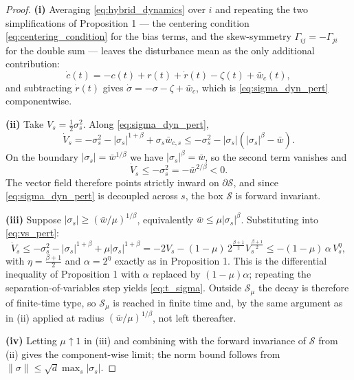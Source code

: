 \documentclass[11pt]{article}
\begin{document}
\begin{proof}
\textbf{(i)} Averaging \eqref{eq:hybrid_dynamics} over $i$ and repeating the two simplifications of Proposition 1 --- the centering condition \eqref{eq:centering_condition} for the bias terms, and the skew-symmetry $\Gamma_{ij} = -\Gamma_{ji}$ for the double sum --- leaves the disturbance mean as the only additional contribution:
\begin{equation}
\dot{c}(t) = -c(t) + r(t) + \dot{r}(t) - \zeta(t) + \bar{w}_c(t),
\end{equation}
and subtracting $\dot{r}(t)$ gives $\dot{\sigma} = -\sigma - \zeta + \bar{w}_c$, which is \eqref{eq:sigma_dyn_pert} componentwise.

\textbf{(ii)} Take $V_s = \frac{1}{2}\sigma_s^2$. Along \eqref{eq:sigma_dyn_pert},
\begin{equation}
\dot{V}_s = -\sigma_s^2 - |\sigma_s|^{1+\beta} + \sigma_s \bar{w}_{c,s} \le -\sigma_s^2 - |\sigma_s|\left(|\sigma_s|^\beta - \bar{w}\right).
\label{eq:vs_pert}
\end{equation}
On the boundary $|\sigma_s| = \bar{w}^{1/\beta}$ we have $|\sigma_s|^\beta = \bar{w}$, so the second term vanishes and
\begin{equation}
\dot{V}_s \le -\sigma_s^2 = -\bar{w}^{2/\beta} < 0 .
\end{equation}
The vector field therefore points strictly inward on $\partial\mathcal{S}$, and since \eqref{eq:sigma_dyn_pert} is decoupled across $s$, the box $\mathcal{S}$ is forward invariant.

\textbf{(iii)} Suppose $|\sigma_s| \ge (\bar{w}/\mu)^{1/\beta}$, equivalently $\bar{w} \le \mu|\sigma_s|^\beta$. Substituting into \eqref{eq:vs_pert}:
\begin{equation}
\dot{V}_s \le -\sigma_s^2 - |\sigma_s|^{1+\beta} + \mu|\sigma_s|^{1+\beta} = -2V_s - (1-\mu)\,2^{\frac{\beta+1}{2}} V_s^{\frac{\beta+1}{2}} \le -(1-\mu)\,\alpha\, V_s^{\eta},
\end{equation}
with $\eta = \frac{\beta+1}{2}$ and $\alpha = 2^\eta$ exactly as in Proposition 1. This is the differential inequality of Proposition 1 with $\alpha$ replaced by $(1-\mu)\alpha$; repeating the separation-of-variables step yields \eqref{eq:t_sigma}. Outside $\mathcal{S}_\mu$ the decay is therefore of finite-time type, so $\mathcal{S}_\mu$ is reached in finite time and, by the same argument as in (ii) applied at radius $(\bar{w}/\mu)^{1/\beta}$, not left thereafter.

\textbf{(iv)} Letting $\mu \uparrow 1$ in (iii) and combining with the forward invariance of $\mathcal{S}$ from (ii) gives the component-wise limit; the norm bound follows from $\|\sigma\| \le \sqrt{d}\max_s|\sigma_s|$.
\end{proof}
\end{document}
